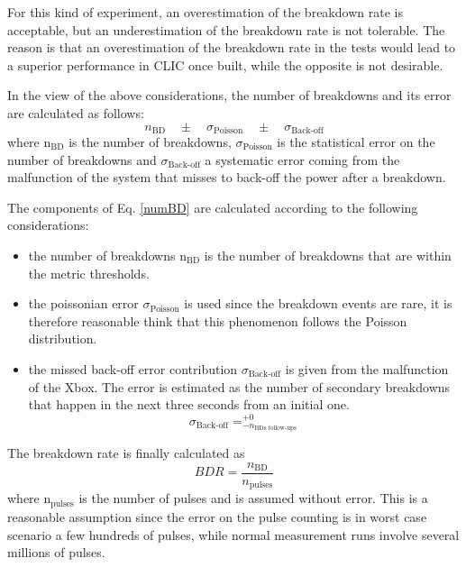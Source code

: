 For this kind of experiment, an overestimation of the breakdown rate is acceptable, but an underestimation of the breakdown rate is not tolerable. The reason is that an overestimation of the breakdown rate in the tests would lead to a superior performance in CLIC once built, while the opposite is not desirable.   

In the view of the above considerations, the number of breakdowns and its error are calculated as follows:
\begin{equation}
n_{\text{BD}} \quad \pm \quad \sigma_{\text{Poisson}} \quad \pm \quad \sigma_{\text{Back-off}} 
\label{numBD}
\end{equation}
where  n$_{\text{BD}}$ is the number of breakdowns, $\sigma_{\text{Poisson}}$ is the statistical error on the number of breakdowns and $\sigma_{\text{Back-off}}$ a systematic error coming from the malfunction of the system that misses to back-off the power after a breakdown.

The components of Eq. \ref{numBD} are calculated according to the following considerations:
\begin{itemize}
\item the number of breakdowns n$_{\text{BD}}$ is the number of breakdowns that are within the metric thresholds.  
\item the poissonian error $\sigma_{\text{Poisson}}$ is used since the breakdown events are rare, it is therefore reasonable think that this phenomenon follows the Poisson distribution.
\item the missed back-off error contribution $ \sigma_{\text{Back-off}}$ is given from the malfunction of the Xbox. The error is estimated as the number of secondary breakdowns that happen in the next three seconds from an initial one. 
\begin{equation}
\sigma_{\text{Back-off}} = _{- n_{\text{BDs follow-ups}}}^{+ 0}
\end{equation}
\end{itemize}

\noindent
The breakdown rate is finally calculated as
\begin{equation}
BDR = \frac{n_{\text{BD}}}{n_{\text{pulses}}}
\end{equation}
where n$_{\text{pulses}}$ is the number of pulses and is assumed without error. This is a reasonable assumption since the error on the pulse counting is in worst case scenario a few hundreds of pulses, while normal measurement runs involve several millions of pulses.